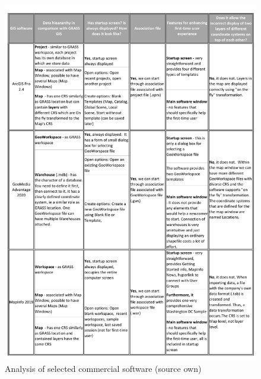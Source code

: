 \documentclass[a4paper,10pt,twoside]{article}
\begin{document}
\vspace{0.3cm}
\begin{figure}[hbt!] 
\begin{center}
\includegraphics[width=15cm]{../pictures/commercial_software.pdf}
\caption[Analysis of selected commercial software (source own)]{Analysis of selected commercial software (source own)}
\label{fig:commercial_software}
\end{center}
\end{figure}
\end{document}

